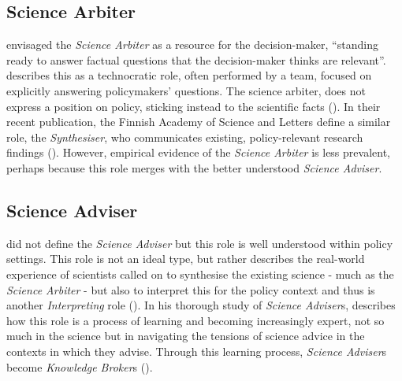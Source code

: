 \subsection{Science Arbiter}
\textcite{Pielke2007} envisaged the \emph{Science Arbiter} as a resource for the decision-maker, ``standing ready to answer factual questions that the decision-maker thinks are relevant''. \textcite{GluckmanBK2021} describes this as a technocratic role, often performed by a team, focused on explicitly answering policymakers' questions. The science arbiter, does not express a position on policy, sticking instead to the scientific facts (\cite{RapleyD2014}). In their recent publication, the Finnish Academy of Science and Letters define a similar role, the \emph{Synthesiser}, who communicates existing, policy-relevant research findings (\cite{KarkkainenLKK2024}). However, empirical evidence of the \emph{Science Arbiter} is less prevalent, perhaps because this role merges with the better understood \emph{Science Adviser}.

\subsection{Science Adviser}
\textcite{Pielke2007} did not define the \emph{Science Adviser} but this role is well understood within policy settings. This role is not an ideal type, but rather describes the real-world experience of scientists called on to synthesise the existing science - much as the \emph{Science Arbiter} - but also to interpret this for the policy context and thus is another \emph{Interpreting} role (\cite{SteelLLS2004,SinghTKMMC2014}). In his thorough study of \emph{Science Adviser}s, \textcite{Obermeister2020} describes how this role is a process of learning and becoming increasingly expert, not so much in the science but in navigating the tensions of science advice in the contexts in which they advise. Through this learning process, \emph{Science Adviser}s become \emph{Knowledge Broker}s (\cite{Obermeister2020,GluckmanBK2021}).

